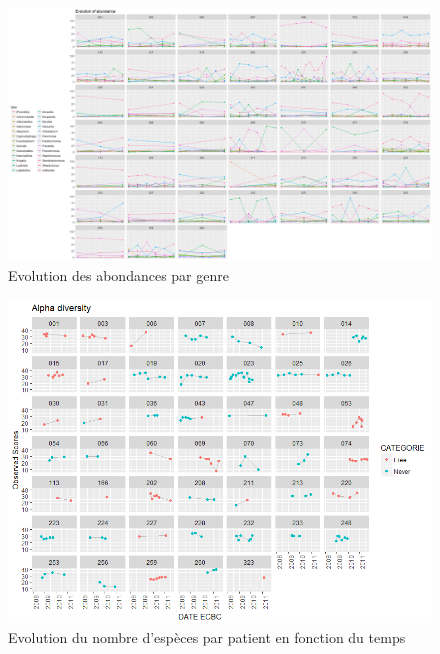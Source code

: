 \documentclass[12pt,a4paper]{article}
\begin{document}
\begin{figure}
\begin{center}
\includegraphics[scale=0.40,angle=90]{img/evolution_abundance.png}\hfill
\end{center}
\caption{Evolution des abondances par genre}
\label{plotabundancecurve}
\end{figure}


\begin{figure}
\begin{center}
\includegraphics[scale=0.80]{img/alpha_observed.png}\hfill
\end{center}
\caption{Evolution du nombre d'espèces par patient en fonction du temps}
\label{alphaObs}
\end{figure}
\end{document}
